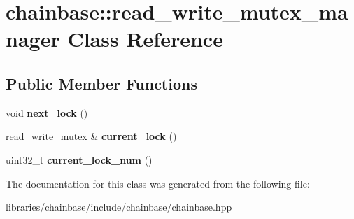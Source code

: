 \hypertarget{classchainbase_1_1read__write__mutex__manager}{}\section{chainbase\+:\+:read\+\_\+write\+\_\+mutex\+\_\+manager Class Reference}
\label{classchainbase_1_1read__write__mutex__manager}
\subsection*{Public Member Functions}
\begin{DoxyCompactItemize}
\item 
\mbox{\label{classchainbase_1_1read__write__mutex__manager_a7d6e313b4634c652379ec2d99f3db4c4}} 
void {\bfseries next\+\_\+lock} ()
\item 
\mbox{\label{classchainbase_1_1read__write__mutex__manager_abd785f61581baea9aa6580e4a8537d02}} 
read\+\_\+write\+\_\+mutex \& {\bfseries current\+\_\+lock} ()
\item 
\mbox{\label{classchainbase_1_1read__write__mutex__manager_a261f3a9e386609949abf578f18688825}} 
uint32\+\_\+t {\bfseries current\+\_\+lock\+\_\+num} ()
\end{DoxyCompactItemize}


The documentation for this class was generated from the following file\+:\begin{DoxyCompactItemize}
\item 
libraries/chainbase/include/chainbase/chainbase.\+hpp\end{DoxyCompactItemize}
